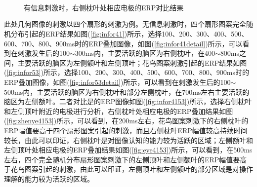 \documentclass{hitreport}
\begin{document}
\begin{figure}[htb]
\centering
	\\
	\\
	\\
\caption{有信息刺激时，右侧枕叶处相应电极的ERP对比结果}\label{fig:zhenye3252}
\end{figure}


此处几何图像的刺激以四个扇形的刺激为例。无信息刺激时，四个扇形图案完全随机分布引起的ERP结果如图(\ref{fig:infor41})所示，选择100、200、300、400、500、600、700、800、900ms时的ERP叠加图像，如图(\ref{fig:infor41detail})所示，可以看到在刺激发生后的100$\sim$300ms内，主要活跃的脑区为右侧枕叶，在400$\sim$800ms之间，主要活跃的脑区为左侧额叶和左侧顶叶；花鸟图案刺激引起的ERP结果如图(\ref{fig:infor53})所示，选择100、200、300、400、500、600、700、800、900ms时的ERP叠加图像，如图(\ref{fig:infor53detail})所示，可以看到在刺激发生后的100$\sim$500ms内，主要活跃的脑区为右侧枕叶和部分左侧枕叶，在700ms左右主要活跃的脑区为左侧额叶。二者对比是的ERP图像如图(\ref{fig:infor4153})所示，选择右侧枕叶和左侧顶叶附近的电极进行分析，右侧枕叶处相应电极的ERP叠加结果如图(\ref{fig:zhenye4153})所示，可以看到，在200ms左右，花鸟图案刺激下的右侧枕叶的ERP幅值要高于四个扇形图案引起的刺激，而且右侧枕叶ERP幅值较高持续时间较长，由此可以印证，右侧枕叶是对图像认知的能力较为活跃的区域；左侧额叶和左侧顶叶处相应电极的ERP叠加结果如图(\ref{fig:eye4153})所示，可以看到，在500ms左右，四个完全随机分布扇形图案刺激下的左侧顶叶和左侧额叶的ERP幅值要高于花鸟图案引起的刺激，由此可以印证，左侧顶叶和左侧额叶的部分区域是对操作理解的能力较为活跃的区域。
\end{document}
